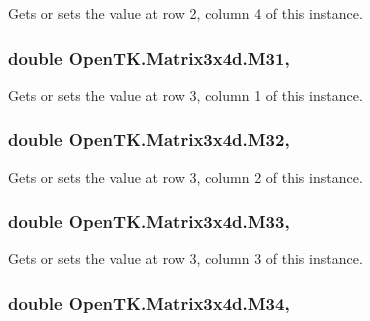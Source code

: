 Gets or sets the value at row 2, column 4 of this instance. 

\hypertarget{struct_open_t_k_1_1_matrix3x4d_ae5d48c56739dc8c024bfab361c9e4f55}{
\subsubsection[{M31}]{\setlength{\rightskip}{0pt plus 5cm}double Open\-T\-K.\-Matrix3x4d.\-M31\hspace{0.3cm}{\ttfamily [get]}, {\ttfamily [set]}}}\label{struct_open_t_k_1_1_matrix3x4d_ae5d48c56739dc8c024bfab361c9e4f55}


Gets or sets the value at row 3, column 1 of this instance. 

\hypertarget{struct_open_t_k_1_1_matrix3x4d_a0774ba86b773d65e7ed68269afce59a1}{
\subsubsection[{M32}]{\setlength{\rightskip}{0pt plus 5cm}double Open\-T\-K.\-Matrix3x4d.\-M32\hspace{0.3cm}{\ttfamily [get]}, {\ttfamily [set]}}}\label{struct_open_t_k_1_1_matrix3x4d_a0774ba86b773d65e7ed68269afce59a1}


Gets or sets the value at row 3, column 2 of this instance. 

\hypertarget{struct_open_t_k_1_1_matrix3x4d_a2a96e4092590cc10611b16a055ee0c40}{
\subsubsection[{M33}]{\setlength{\rightskip}{0pt plus 5cm}double Open\-T\-K.\-Matrix3x4d.\-M33\hspace{0.3cm}{\ttfamily [get]}, {\ttfamily [set]}}}\label{struct_open_t_k_1_1_matrix3x4d_a2a96e4092590cc10611b16a055ee0c40}


Gets or sets the value at row 3, column 3 of this instance. 

\hypertarget{struct_open_t_k_1_1_matrix3x4d_abeee8ae82517d78e46f8975167bac0ab}{
\subsubsection[{M34}]{\setlength{\rightskip}{0pt plus 5cm}double Open\-T\-K.\-Matrix3x4d.\-M34\hspace{0.3cm}{\ttfamily [get]}, {\ttfamily [set]}}}\label{struct_open_t_k_1_1_matrix3x4d_abeee8ae82517d78e46f8975167bac0ab}



